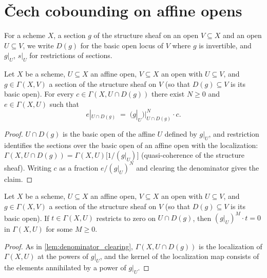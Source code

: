 \section{\v{C}ech cobounding on affine opens}

For a scheme \(X\), a section \(g\) of the structure sheaf on an open \(V \subseteq X\) and
an open \(U \subseteq V\), we write \(D(g)\) for the basic open locus of \(V\) where \(g\) is
invertible, and \(g|_U\), \(s|_U\) for restrictions of sections.

\begin{lemma}
  \label{lem:denominator_clearing}
  \leanok
  Let \(X\) be a scheme, \(U \subseteq X\) an affine open, \(V \subseteq X\) an open with
  \(U \subseteq V\), and \(g \in \Gamma(X, V)\) a section of the structure sheaf on \(V\) (so
  that \(D(g) \subseteq V\) is its basic open). For every \(c \in \Gamma(X, U \cap D(g))\)
  there exist \(N \ge 0\) and \(e \in \Gamma(X, U)\) such that
  \[
    e|_{U \cap D(g)} \;=\; \bigl(g|_{U}\bigr)|_{U \cap D(g)}^{N} \cdot c .
  \]
\end{lemma}
\begin{proof}
  \leanok
  \(U \cap D(g)\) is the basic open of the affine \(U\) defined by \(g|_U\), and restriction
  identifies the sections over the basic open of an affine open with the localization:
  \(\Gamma(X, U \cap D(g)) = \Gamma(X, U)\bigl[1/(g|_U)\bigr]\) (quasi-coherence of the
  structure sheaf). Writing \(c\) as a fraction \(e / (g|_U)^N\) and clearing the denominator
  gives the claim.
\end{proof}

\begin{lemma}
  \label{lem:section_annihilation}
  \leanok
  Let \(X\) be a scheme, \(U \subseteq X\) an affine open, \(V \subseteq X\) an open with
  \(U \subseteq V\), and \(g \in \Gamma(X, V)\) a section of the structure sheaf on \(V\) (so
  that \(D(g) \subseteq V\) is its basic open). If \(t \in \Gamma(X, U)\) restricts to zero
  on \(U \cap D(g)\), then \((g|_U)^{M} \cdot t = 0\) in \(\Gamma(X, U)\) for some \(M \ge 0\).
\end{lemma}
\begin{proof}
  \leanok
  As in \ref{lem:denominator_clearing}, \(\Gamma(X, U \cap D(g))\) is the localization of
  \(\Gamma(X, U)\) at the powers of \(g|_U\), and the kernel of the localization map consists
  of the elements annihilated by a power of \(g|_U\).
\end{proof}

